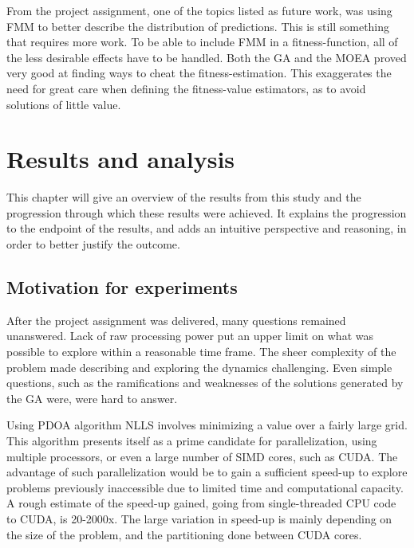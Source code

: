 \documentclass[10pt,a4paper]{book}
\begin{document}
From the project assignment, one of the topics listed as future work, was using \gls{FMM} to better describe the distribution of predictions. This is still something that requires more work. To be able to include \gls{FMM} in a fitness-function, all of the less desirable effects have to be handled. Both the \gls{GA} and the \gls{MOEA} proved very good at finding ways to cheat the fitness-estimation. This exaggerates the need for great care when defining the fitness-value estimators, as to avoid solutions of little value.



\chapter{Results and analysis}

This chapter will give an overview of the results from this study and the progression through which these results were achieved. It explains the progression to the endpoint of the results, and adds an intuitive perspective and reasoning, in order to better justify the outcome. 


\newpage


\section{Motivation for experiments}



After the project assignment was delivered, many questions remained unanswered. Lack of raw processing power put an upper limit on what was possible to explore within a reasonable time frame. The sheer complexity of the problem made describing and exploring the dynamics challenging. Even simple questions, such as the ramifications and weaknesses of the solutions generated by the \gls{GA} were, were hard to answer. 

Using \gls{PDOA} algorithm \gls{NLLS} involves minimizing a value over a fairly large grid. This algorithm presents itself as a prime candidate for parallelization, using multiple processors, or even a large number of \gls{SIMD} cores, such as \gls{CUDA}. The advantage of such  parallelization would be to gain a sufficient speed-up to explore problems previously inaccessible due to limited time and computational capacity. A rough estimate of the speed-up gained, going from single-threaded \gls{CPU} code to \gls{CUDA}, is 20-2000x. The large variation in speed-up is mainly depending on the size of the problem, and the partitioning done between \gls{CUDA} cores.
\end{document}
